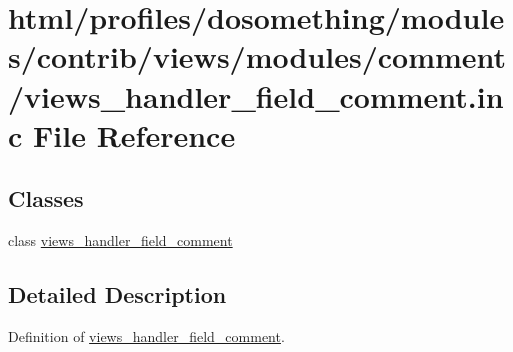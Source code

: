 \hypertarget{views__handler__field__comment_8inc}{
\section{html/profiles/dosomething/modules/contrib/views/modules/comment/views\_\-handler\_\-field\_\-comment.inc File Reference}
\label{views__handler__field__comment_8inc}
}
\subsection*{Classes}
\begin{DoxyCompactItemize}
\item 
class \hyperlink{classviews__handler__field__comment}{views\_\-handler\_\-field\_\-comment}
\end{DoxyCompactItemize}


\subsection{Detailed Description}
Definition of \hyperlink{classviews__handler__field__comment}{views\_\-handler\_\-field\_\-comment}. 